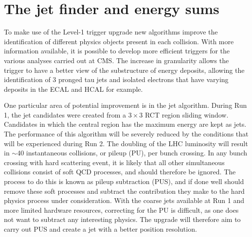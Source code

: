 \section{The jet finder and energy sums}
\label{sec:jetFinder}

To make use of the Level-1 trigger upgrade new algorithms improve the
identification of different physics objects present in each collision. With more information
available, it is possible to develop more efficient triggers for the
various analyses carried out at CMS. The increase in granularity
allows the trigger to have a better view of the substructure of energy
deposits, allowing the identification of 3 pronged tau jets and
isolated electrons that have varying deposits in the ECAL and HCAL for
example. 

One particular area of potential improvement is in the jet algorithm.
During Run 1, the jet candidates were created from a $3\times3$ RCT
region sliding window. Candidates in which the central region has the
maximum energy are kept as jets. The performance of this algorithm
will be severely reduced by the conditions that will be experienced
during Run 2. The doubling of the LHC luminosity will result in
$\sim$40 instantaneous collisions, or pileup (PU), per bunch crossing.
In any bunch crossing with hard scattering event, it is likely that
all other simultaneous collisions consist of soft QCD processes, and
should therefore be ignored. The process to do this is known as pileup
subtraction (PUS), and if done well should remove these soft processes
and subtract the contribution they make to the hard physics process
under consideration. With the coarse jets available at Run 1 and more
limited hardware resources, correcting for the PU is difficult, as one
does not want to subtract any interesting physics. The upgrade will
therefore aim to carry out PUS and create a jet with a better position
resolution.

